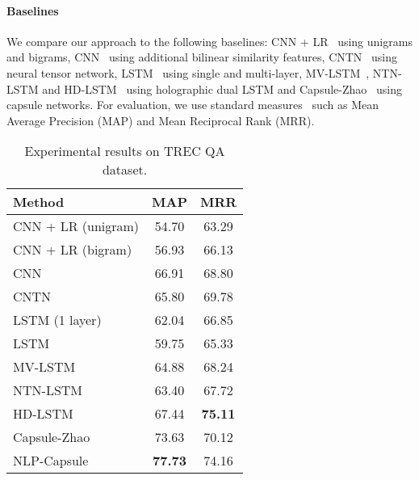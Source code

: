 \documentclass[11pt,a4paper]{article}
\newcommand{\1}{\boldsymbol{1}}
\begin{document}
\paragraph{Baselines}We compare our approach to the following baselines: CNN + LR~\cite{yu2014deep} using unigrams and bigrams, CNN~\cite{severyn2015learning} using additional bilinear similarity features, CNTN~\cite{qiu2015convolutional} using neural tensor network, LSTM~\cite{tay2017learning} using single and multi-layer, MV-LSTM~\cite{wan2016deep}, NTN-LSTM and HD-LSTM~\cite{tay2017learning} using holographic dual LSTM and Capsule-Zhao~\cite{zhao2018investigating} using capsule networks.
For evaluation, 
we use standard measures~\cite{wang2007jeopardy} such as Mean Average Precision (MAP) and Mean Reciprocal Rank (MRR).

\begin{table}[t]
\centering
	\caption{Characteristic of TREC QA dataset. \%Positive denotes the percentage of positive answers.}
	\label{tab:qa_data}
\end{table}

\begin{table}[b]
\centering
\small
	\begin{tabular}{|l| c |c|}
		\toprule
		Method & MAP & MRR\\
		\midrule
		CNN + LR (unigram) & 54.70 & 63.29 \\
		CNN + LR (bigram) & 56.93 & 66.13 \\
		CNN & 66.91 & 68.80 \\
		CNTN & 65.80 & 69.78 \\
		\midrule
		LSTM (1 layer) & 62.04 & 66.85 \\
		LSTM & 59.75 & 65.33 \\
		MV-LSTM & 64.88 & 68.24 \\
		NTN-LSTM & 63.40 & 67.72 \\
		HD-LSTM & 67.44 & \textbf{75.11} \\
		\midrule
		Capsule-Zhao & 73.63 & 70.12 \\
		\midrule
		NLP-Capsule & \textbf{77.73} & 74.16\\       
		\bottomrule
	\end{tabular}
	\caption{Experimental results on TREC QA dataset.}
	\label{tab:qa_results}
\end{table}
\end{document}

